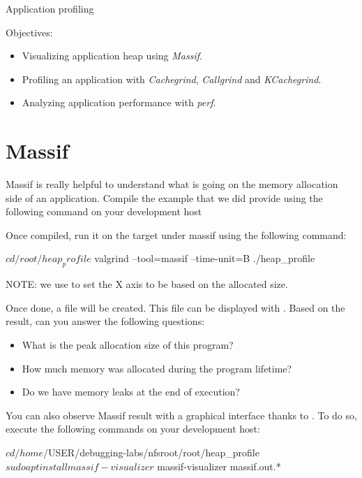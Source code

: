 \subchapter
{Application profiling}
{Objectives:
  \begin{itemize}
    \item Visualizing application heap using {\em Massif}.
    \item Profiling an application with {\em Cachegrind}, {\em Callgrind} and
          {\em KCachegrind}.
    \item Analyzing application performance with {\em perf}.
  \end{itemize}
}

\section{Massif}

Massif is really helpful to understand what is going on the memory allocation
side of an application. Compile the  example that we did provide
using the following command on your development host


Once compiled, run it on the target under massif using the following command:

\begin{bashinput}
$ cd /root/heap_profile
$ valgrind --tool=massif --time-unit=B ./heap_profile
\end{bashinput}

NOTE: we use  to set the X axis to be based on the allocated
size.

Once done, a  file will be created. This file can be
displayed with . Based on the result, can you answer the
following questions:
\begin{itemize}
  \item What is the peak allocation size of this program?
  \item How much memory was allocated during the program lifetime?
  \item Do we have memory leaks at the end of execution?
\end{itemize}

You can also observe Massif result with a graphical interface thanks to
. To do so, execute the following commands on your
development host:

\begin{bashinput}
$ cd /home/$USER/debugging-labs/nfsroot/root/heap_profile
$ sudo apt install massif-visualizer
$ massif-visualizer massif.out.*
\end{bashinput}

